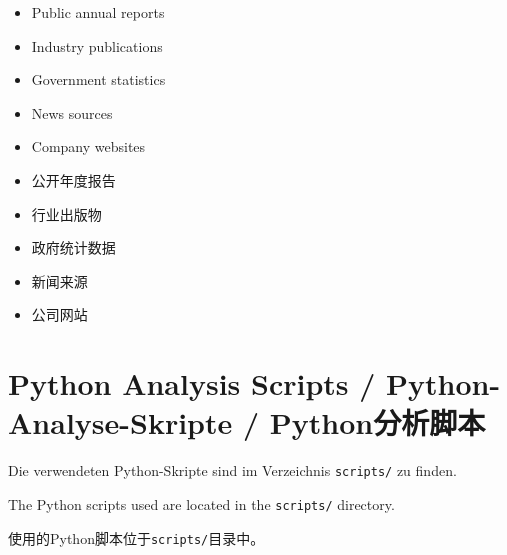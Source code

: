 \begin{itemize}
    \item Public annual reports
    \item Industry publications
    \item Government statistics
    \item News sources
    \item Company websites
\end{itemize}

\begin{itemize}
    \item 公开年度报告
    \item 行业出版物
    \item 政府统计数据
    \item 新闻来源
    \item 公司网站
\end{itemize}

\section{Python Analysis Scripts / Python-Analyse-Skripte / Python分析脚本}

\begin{otherlanguage}{ngerman}
Die verwendeten Python-Skripte sind im Verzeichnis \texttt{scripts/} zu finden.
\end{otherlanguage}

The Python scripts used are located in the \texttt{scripts/} directory.

使用的Python脚本位于\texttt{scripts/}目录中。
